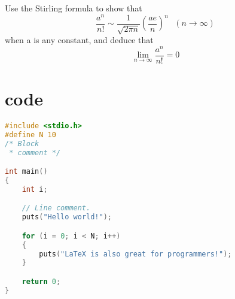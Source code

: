 \documentclass[12pt]{article}
\begin{document}
\begin{theorem}
Use the Stirling formula to show that
\begin{equation*}
\frac{a^n}{n!}\sim\frac{1}{\sqrt{2\pi n}}
\left(\frac{ae}{n}\right)^n~~~(n\to\infty)
\end{equation*}
when a is any constant, and deduce that
\[ \lim_{n \to \infty}\frac{a^n}{n!}=0\]
\end{theorem}

\section{code}
\begin{latin}
\begin{lstlisting}[language=C]
#include <stdio.h>
#define N 10
/* Block
 * comment */

int main()
{
    int i;

    // Line comment.
    puts("Hello world!");

    for (i = 0; i < N; i++)
    {
        puts("LaTeX is also great for programmers!");
    }

    return 0;
}
\end{lstlisting}
\end{latin}
\end{document}
